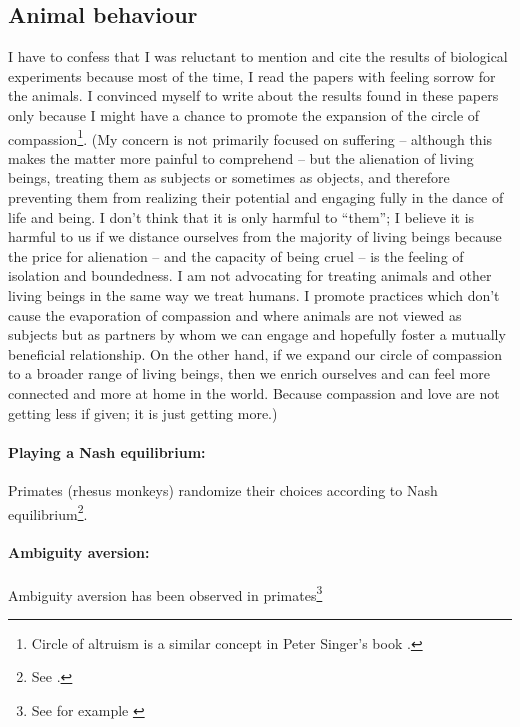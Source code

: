 \documentclass{article}
\begin{document}

\subsection*{Animal behaviour}

I have to confess that I was reluctant to mention and cite the results of biological experiments because most of the time, I read the papers with feeling sorrow for the animals.
I convinced myself to write about the results found in these papers only because I might have a chance to promote the expansion of the circle of compassion\footnote{Circle of altruism is a similar concept in Peter Singer's book \cite{book:ExpandingCircle}.}.
(My concern is not primarily focused on suffering -- although this makes the matter more painful to comprehend -- but the alienation of living beings, treating them as subjects or sometimes as objects, and therefore preventing them from realizing their potential and engaging fully in the dance of life and being. I don't think that it is only harmful to ``them''; I believe it is harmful to us if we distance ourselves from the majority of living beings because the price for alienation -- and the capacity of being cruel -- is the feeling of isolation and boundedness. I am not advocating for treating animals and other living beings in the same way we treat humans. I promote practices which don't cause the evaporation of compassion and where animals are not viewed as subjects but as partners by whom we can engage and hopefully foster a mutually beneficial relationship. On the other hand, if we expand our circle of compassion to a broader range of living beings, then we enrich ourselves and can feel more connected and more at home in the world. Because compassion and love are not getting less if given; it is just getting more.)


\paragraph{Playing a Nash equilibrium:}
Primates (rhesus monkeys) randomize their choices according to Nash equilibrium\footnote{See \cite{paper:PrimateRandomArticle}.}.


\paragraph{Ambiguity aversion:}
Ambiguity aversion has been observed in primates\footnote{See for example \cite{paper:ChimpanzeesBonobosAmbiguity,paper:PrimatesAmbiguity,paper:RhesusMacaquesAmbiguity}}
\end{document}
